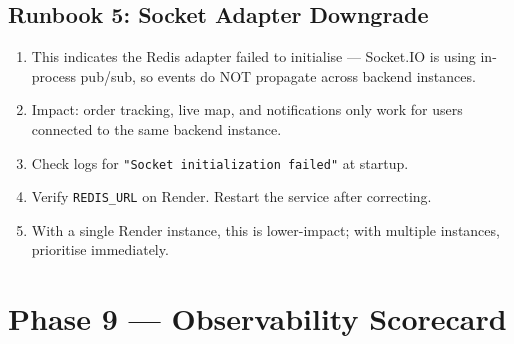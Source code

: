 \documentclass[12pt,a4paper]{article}
\begin{document}
\subsection{Runbook 5: Socket Adapter Downgrade}

\begin{tcolorbox}[colback=info!8,colframe=info,title=\textbf{Trigger: /health/extended shows adapterType: in-memory}]
\begin{enumerate}[leftmargin=*,nosep]
  \item This indicates the Redis adapter failed to initialise — Socket.IO is using
        in-process pub/sub, so events do NOT propagate across backend instances.
  \item Impact: order tracking, live map, and notifications only work for users
        connected to the same backend instance.
  \item Check logs for \texttt{"Socket initialization failed"} at startup.
  \item Verify \texttt{REDIS\_URL} on Render.  Restart the service after correcting.
  \item With a single Render instance, this is lower-impact; with multiple
        instances, prioritise immediately.
\end{enumerate}
\end{tcolorbox}

\newpage

\section{Phase 9 — Observability Scorecard}
\end{document}
